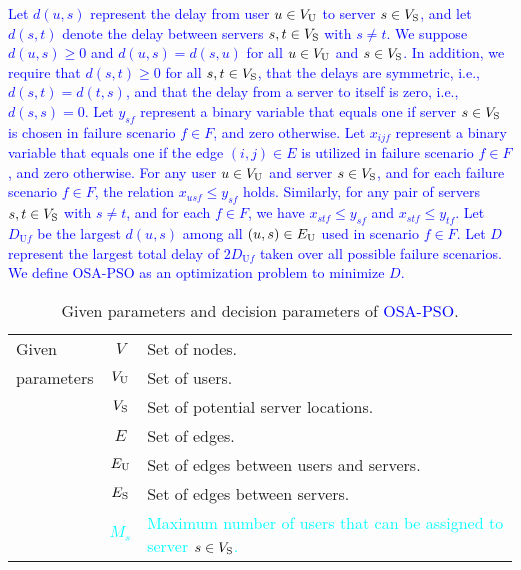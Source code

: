 \documentclass[10pt, letterpaper]{IEEEtran}
\newcommand\blue[1]{\textcolor{blue}{#1}}
\newcommand\cyan[1]{\textcolor{cyan}{#1}}
\begin{document}
\begin{CJK}{UTF8}{ipxm}
\blue{
Let $d(u,s)$ represent the delay from user $u \in V_{\rm{U}}$ to server $s \in V_{\rm{S}}$, and let $d(s,t)$ denote the delay between servers $s, t \in V_{\rm{S}}$ with $s \neq t$.
We suppose $d(u,s) \geq 0$ and $d(u,s) = d(s,u)$ for all $u \in V_{\rm{U}}$ and $s \in V_{\rm{S}}$.
In addition, we require that $d(s,t) \geq 0$ for all $s, t \in V_{\rm{S}}$, that the delays are symmetric, i.e., $d(s,t) = d(t,s)$, and that the delay from a server to itself is zero, i.e., $d(s,s) = 0$.
Let $y_{sf}$ represent a binary variable that equals one if server $s \in V_{\rm{S}}$ is chosen in failure scenario $f \in F$, and zero otherwise.
Let $x_{ijf}$ represent a binary variable that equals one if the edge $(i,j) \in E$ is utilized in failure scenario $f \in F$, and zero otherwise.
For any user $u \in V_{\rm{U}}$ and server $s \in V_{\rm{S}}$, and for each failure scenario $f \in F$, the relation $x_{usf} \le y_{sf}$ holds. 
Similarly, for any pair of servers $s, t \in V_{\rm{S}}$ with $s \neq t$, and for each $f \in F$, we have $x_{stf} \le y_{sf}$ and $x_{stf} \le y_{tf}$. 
Let $D_{\mathrm{U}f}$ be the largest $d(u,s)$ among all $(u,s) \in E_{\rm{U}}$ used in scenario $f \in F$.
Let $D$ represent the largest total delay of $2D_{\mathrm{U}f}$ taken over all possible failure scenarios.
We define OSA-PSO as an optimization problem to minimize $D$.
% 
\begin{table}[tb]
    \centering
    \caption{Given parameters and decision parameters of \blue{OSA-PSO}.}
    \label{tbl:notation_OSA-PSO}
    \begin{tabular}{p{1.3cm}|cp{5.4cm}}
        \hline
        \small
        Given & $V$ & Set of nodes. \\
        parameters & $V_{\rm{U}}$ & Set of users. \\
        & $V_{\rm{S}}$ & Set of potential server locations. \\
        & $E$ & Set of edges. \\
        & $E_{\rm{U}}$ & Set of edges between users and servers. \\
        & $E_{\rm{S}}$ & Set of edges between servers. \\
        & \cyan{$M_s$} & \cyan{Maximum number of users that can be assigned to server $s \in V_{\rm{S}}$.} \\

\end{tabular}
\end{table}}
\end{CJK}
\end{document}
